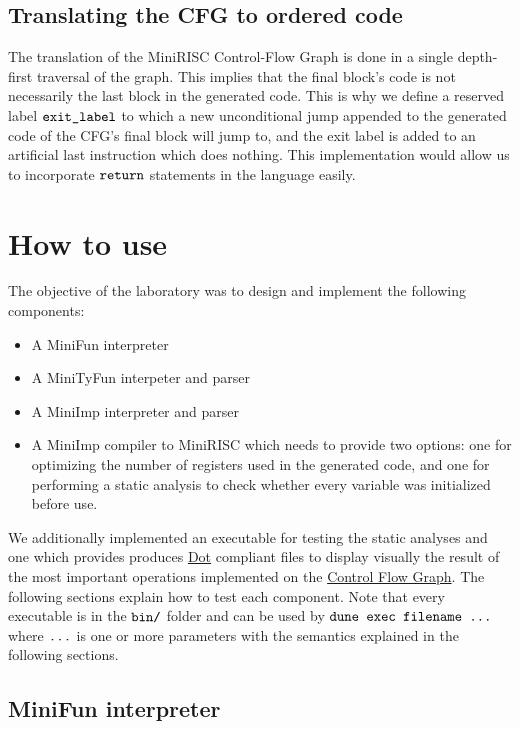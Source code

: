 \documentclass[a4paper,11pt]{report}
\begin{document}
\subsection{Translating the CFG to ordered code}

The translation of the MiniRISC Control-Flow Graph is done in a single depth-first traversal of the graph. This implies that the final block's code is not necessarily the last block in the generated code. This is why we define a reserved label $\verb|exit_label|$ to which a new unconditional jump appended to the generated code of the CFG's final block will jump to, and the exit label is added to an artificial last instruction which does nothing. This implementation would allow us to incorporate $\verb|return|$ statements in the language easily.

\section{How to use}

The objective of the laboratory was to design and implement the following components:

\begin{itemize}
	\item A MiniFun interpreter 
	\item A MiniTyFun interpeter and parser
	\item A MiniImp interpreter and parser
	\item A MiniImp compiler to MiniRISC which needs to provide two options: one for optimizing the number of registers used in the generated code, and one for performing a static analysis to check whether every variable was initialized before use. 
\end{itemize}

We additionally implemented an executable for testing the static analyses and one which provides produces \href{https://en.wikipedia.org/wiki/DOT_(graph_description_language)}{Dot} compliant files to display visually the result of the most important operations implemented on the \hyperref[Section::CFG]{Control Flow Graph}.
The following sections explain how to test each component.
Note that every executable is in the $\verb|bin/|$ folder and can be used by $\verb|dune exec filename ...|$ where $\verb|...|$ is one or more parameters with the semantics explained in the following sections.

\subsection{MiniFun interpreter}
\end{document}
